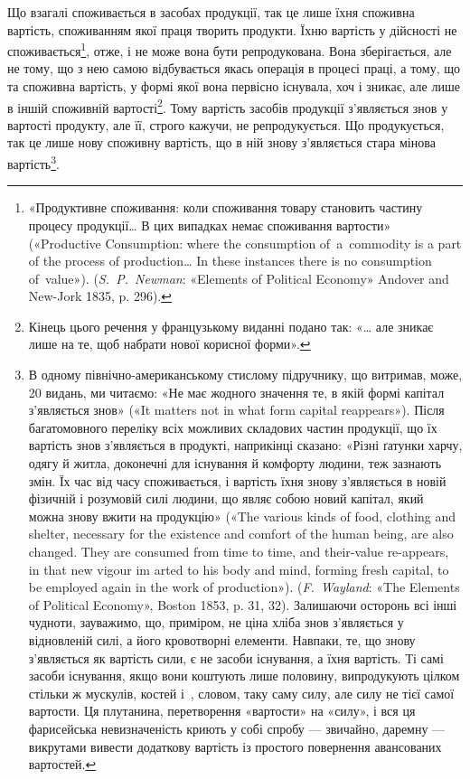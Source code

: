 Що взагалі споживається в засобах продукції, так це лише
їхня споживна вартість, споживанням якої праця творить продукти.
Їхню вартість у дійсності не споживається\footnote{
«Продуктивне споживання: коли споживання товару становить
частину процесу продукції\dots{} В цих випадках немає споживання вартости»
(«\textenglish{Productive Consumption: where the consumption of~a~commodity is a
part of the process of production\dots{} In these instances there is no consumption
of~value}»). (\emph{S.~P.~Newman}: «Elements of Political Economy» Andover
and New-Jork 1835, p. 296).
}, отже, і
не може вона бути репродукована. Вона зберігається, але не
тому, що з нею самою відбувається якась операція в процесі
праці, а тому, що та споживна вартість, у формі якої вона первісно
існувала, хоч і зникає, але лише в іншій споживній вартості\footnote*{
Кінець цього речення у французькому виданні подано так: «\dots{} але
зникає лише на те, щоб набрати нової корисної форми». 
}.
Тому вартість засобів продукції з’являється знов у вартості
продукту, але її, строго кажучи, не репродукується. Що продукується,
так це лише нову споживну вартість, що в ній знову
з’являється стара мінова вартість\footnote{
В одному північно-американському стислому підручнику, що витримав,
може, 20 видань, ми читаємо: «Не має жодного значення те, в
якій формі капітал з’являється знов» («It matters not in what form capital
reappears»). Після багатомовного переліку всіх можливих складових
частин продукції, що їх вартість знов з’являється в продукті, наприкінці
сказано: «Різні ґатунки харчу, одягу й житла, доконечні для існування
й комфорту людини, теж зазнають змін. Їх час від часу споживається, і
вартість їхня знову з’являється в новій фізичній і розумовій силі людини, що
являє собою новий капітал, який можна знову вжити на продукцію» («The
various kinds of food, clothing and shelter, necessary for the existence and
comfort of the human being, are also changed. They are consumed from time
to time, and their-value re-appears, in that new vigour im arted to his
body and mind, forming fresh capital, to be employed again in the work
of production»). (\emph{F.~Wayland}: «The Elements of Political Economy»,
Boston 1853, p. 31, 32). Залишаючи осторонь всі інші чудноти, зауважимо,
що, приміром, не ціна хліба знов з’являється у відновленій силі,
а його кровотворні елементи. Навпаки, те, що знову з’являється як вартість
сили, є не засоби існування, а їхня вартість. Ті самі засоби існування,
якщо вони коштують лише половину, випродукують цілком стільки ж
мускулів, костей і~, словом, таку саму силу, але силу не тієї самої
вартости. Ця плутанина, перетворення «вартости» на «силу», і вся ця
фарисейська невизначеність криють у собі спробу — звичайно, даремну —
викрутами вивести додаткову вартість із простого повернення авансованих
вартостей.
}.


